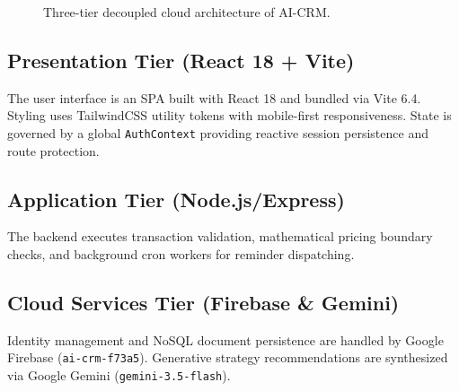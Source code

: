 \documentclass[conference]{IEEEtran}
\begin{document}
\begin{figure}[htbp]
    \centering
    \caption{Three-tier decoupled cloud architecture of AI-CRM.}
    \label{fig:arch_diag}
\end{figure}

\subsection{Presentation Tier (React 18 + Vite)}
The user interface is an SPA built with React 18 and bundled via Vite 6.4. Styling uses TailwindCSS utility tokens with mobile-first responsiveness. State is governed by a global \texttt{AuthContext} providing reactive session persistence and route protection.

\subsection{Application Tier (Node.js/Express)}
The backend executes transaction validation, mathematical pricing boundary checks, and background cron workers for reminder dispatching.

\subsection{Cloud Services Tier (Firebase \& Gemini)}
Identity management and NoSQL document persistence are handled by Google Firebase (\texttt{ai-crm-f73a5}). Generative strategy recommendations are synthesized via Google Gemini (\texttt{gemini-3.5-flash}).
\end{document}
